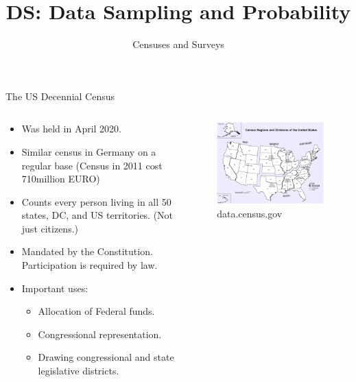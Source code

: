 \documentclass[aspectratio=169]{../latex_main/tntbeamer}  %
\title[Introduction]{DS: Data Sampling and Probability}
\subtitle{Censuses and Surveys}
\begin{document}
	
	\maketitle
	
	\begin{frame}{The US Decennial Census}

          \vspace*{-2em}
	     \begin{columns}
	         \begin{column}{.5\textwidth}
	         \begin{itemize}
	             \item Was held in April 2020.
                \item Similar census in Germany on a regular base (Census in 2011 cost 710million EURO)
	             \item Counts every person living in all 50 states, DC, and US territories. (Not just citizens.)
	             \item Mandated by the Constitution. Participation is required by law.
	             \item Important uses:
	             \begin{itemize}
	                 \item Allocation of Federal funds.
	                 \item Congressional representation.
	                 \item Drawing congressional and state legislative districts.
	             \end{itemize}
	         \end{itemize}
	         

	         \end{column}
	         \begin{column}{.4\textwidth}
	                \begin{figure}
	                    \centering
	                    \includegraphics[scale=.7]{Bild6}
	                    \caption{data.census.gov}
	                \end{figure}
	                


\end{column}
\end{columns}
\end{frame}
\end{document}
